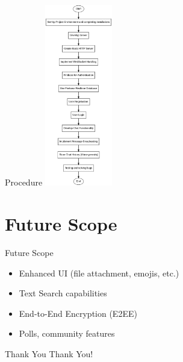 \documentclass{beamer}
\begin{document}
\begin{frame}{Procedure}
    \centering
    \includegraphics[width=0.22\textwidth]{Graphviz files/Images/implementation.png}
\end{frame}

\section{Future Scope}
\begin{frame}{Future Scope}
    \begin{itemize}
        \item Enhanced UI (file attachment, emojis, etc.)
        \item Text Search capabilities
        \item End-to-End Encryption (E2EE)
        \item Polls, community features
    \end{itemize}
\end{frame}

\begin{frame}{Thank You}
    \centering
    \Huge Thank You!
\end{frame}
\end{document}
